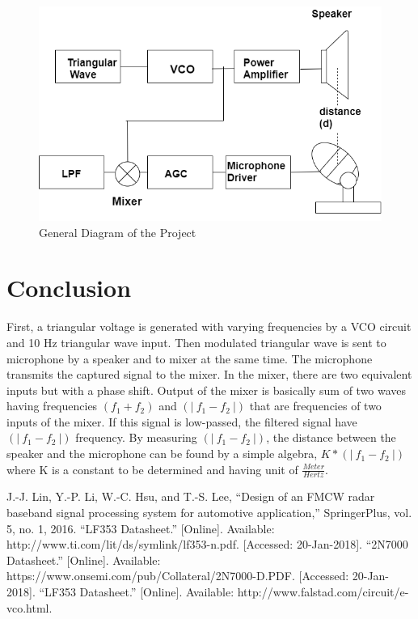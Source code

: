 \documentclass[paper]{IEEEtran}
\begin{document}
\begin{figure}[h!]
\setlength{\unitlength}{\textwidth}
\center 
\includegraphics[width=0.5\unitlength]{diagram3.png}
\caption{\label{fig:diagram}General Diagram of the Project }
\end{figure}	

\vfill

\section{Conclusion}

	First, a triangular voltage is generated with varying frequencies by a VCO circuit and 10 Hz triangular wave input. Then modulated triangular wave is sent to microphone by a speaker and to mixer at the same time. The microphone transmits the captured signal to the mixer. In the mixer, there are two equivalent inputs but with a phase shift. Output of the mixer is basically sum of two waves having frequencies $ (f_1+f_2)$ and $(|~f_1 -f_2~|) $ that are frequencies of two inputs of the mixer. If this signal is low-passed, the filtered signal have $(|~f_1 -f_2~|) $ frequency. By measuring $(|~f_1 -f_2~|) $, the distance between the speaker and the microphone can be found by a simple algebra, $K*(|~f_1 -f_2~|) $ where K is a constant to be determined and having unit of $\frac{Meter}{Hertz} $.

 


\begin{thebibliography}{00}
 J.-J. Lin, Y.-P. Li, W.-C. Hsu, and T.-S. Lee, “Design of an FMCW radar baseband signal processing system for automotive application,” SpringerPlus, vol. 5, no. 1, 2016.	
 “LF353 Datasheet.” [Online]. Available: http://www.ti.com/lit/ds/symlink/lf353-n.pdf. [Accessed: 20-Jan-2018].
 “2N7000 Datasheet.” [Online]. Available: https://www.onsemi.com/pub/Collateral/2N7000-D.PDF. [Accessed: 20-Jan-2018].
 “LF353 Datasheet.” [Online]. Available: http://www.falstad.com/circuit/e-vco.html.

\end{thebibliography}
\end{document}
